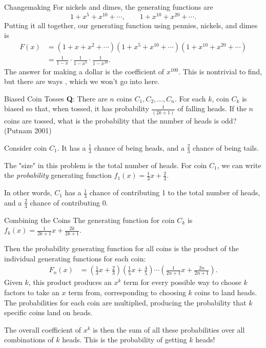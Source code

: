 \documentclass[aspectratio=169]{beamer}
\begin{document}
\begin{frame}{Changemaking}
  For nickels and dimes, the generating functions are
  \[1 + x^5 + x^{10} + \cdots, \qquad 1 + x^{10} + x^{20} + \cdots.\]
  \pause
  Putting it all together, our generating function using pennies, nickels, and dimes is
  \begin{align*}
    F(x) &= (1 + x + x^2 + \cdots)(1 + x^5 + x^{10} + \cdots)(1 + x^{10} + x^{20} + \cdots) \\
    &= \frac{1}{1-x} \cdot \frac{1}{1-x^5} \cdot \frac{1}{1-x^{10}}.
  \end{align*}
  \pause
  The answer for making a dollar is the coefficient of $x^{100}$.
  This is nontrivial to find, but there are ways \cite{gasarch2014ways}, which we won't go into here.
\end{frame}

\begin{frame}{Biased Coin Tosses}
  \textbf{\textcolor{sigma@mainblue}{Q}}: There are $n$ coins $C_1, C_2, \dots, C_n$.
  For each $k$, coin $C_k$ is biased so that, when tossed, it has probability $\tfrac{1}{(2k+1)}$ of falling heads.
  If the $n$ coins are tossed, what is the probability that the number of heads is odd? (Putnam 2001)
  \pause
  
  Consider coin $C_1$.
  It has a $\frac{1}{3}$ chance of being heads, and a $\frac{2}{3}$ chance of being tails.
  \pause

  The "size" in this problem is the total number of heads.
  For coin $C_1$, we can write the \textit{probability} generating function
  $f_1(x) = \frac{1}{3}x + \frac{2}{3}$.

  In other words, $C_1$ has a $\frac{1}{3}$ chance of contributing 1 to the total number of heads, and a $\frac{2}{3}$ chance of contributing 0.
\end{frame}

\begin{frame}{Combining the Coins}
  The generating function for coin $C_k$ is $f_k(x) = \frac{1}{2k+1} x + \frac{2k}{2k+1}$.
  \pause

  Then the probability generating function for all coins is the product of the individual generating functions for each coin:
  \begin{align*}
  F_n(x)
  &= \left( \frac{1}{3}x + \frac{2}{3} \right) \left( \frac{1}{5}x + \frac{4}{5} \right)
  \cdots \left( \frac{1}{2n+1}x + \frac{2n}{2n+1} \right).
  \end{align*}
  \pause
  Given $k$, this product produces an $x^k$ term for every possible way to choose $k$ factors to take an $x$ term from, corresponding to choosing $k$ coins to land heads.
  The probabilities for each coin are multiplied, producing the probability that $k$ specific coins land on heads.

  The overall coefficient of $x^k$ is then the sum of all these probabilities over all combinations of $k$ heads. This is the probability of getting $k$ heads!
\end{frame}
\end{document}
